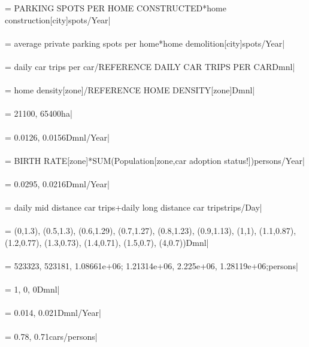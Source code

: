  = {\small PARKING SPOTS PER HOME CONSTRUCTED*home construction[city]spots/Year|} \\ \\ 
 = {\small average private parking spots per home*home demolition[city]spots/Year|} \\ \\ 
 = {\small daily car trips per car/REFERENCE DAILY CAR TRIPS PER CARDmnl|} \\ \\ 
 = {\small home density[zone]/REFERENCE HOME DENSITY[zone]Dmnl|} \\ \\ 
 = {\small 21100, 65400ha|} \\ \\ 
 = {\small 0.0126, 0.0156Dmnl/Year|} \\ \\ 
 = {\small BIRTH RATE[zone]*SUM(Population[zone,car adoption status!])persons/Year|} \\ \\ 
 = {\small 0.0295, 0.0216Dmnl/Year|} \\ \\ 
 = {\small daily mid distance car trips+daily long distance car tripstrips/Day|} \\ \\ 
 = {\small (0,1.3), (0.5,1.3), (0.6,1.29), (0.7,1.27), (0.8,1.23), (0.9,1.13), (1,1), (1.1,0.87), (1.2,0.77), (1.3,0.73), (1.4,0.71), (1.5,0.7), (4,0.7))Dmnl|} \\ \\ 
 = {\small 523323, 523181, 1.08661e+06; 1.21314e+06, 2.225e+06, 1.28119e+06;persons|} \\ \\ 
 = {\small 1, 0, 0Dmnl|} \\ \\ 
 = {\small 0.014, 0.021Dmnl/Year|} \\ \\ 
 = {\small 0.78, 0.71cars/persons|} \\ \\ 
